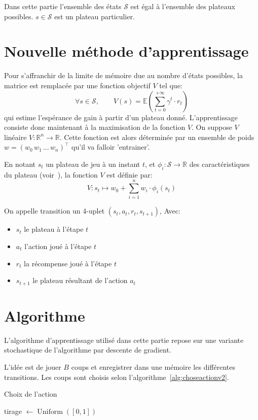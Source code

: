 \documentclass{report}
\newcommand{\R}{\mathbb{R}}
\DeclareMathOperator{\argmax}{argmax}
\DeclareMathOperator{\uniform}{Uniform}
\begin{document}
Dans cette partie l'ensemble des états \( \mathcal{S} \) est égal à l'ensemble
des plateaux possibles. \( s \in \mathcal{S} \) est un plateau particulier.

\section{Nouvelle méthode d'apprentissage}

Pour s'affranchir de la limite de mémoire due au nombre d'états possibles, la
matrice est remplacée par une fonction objectif \( V \) tel que:
\[
\forall s \in \mathcal{S}, \qquad V(s) =
\mathbb{E}(\sum_{t=0}^{+\infty} \gamma ^t \cdot r_t)
\]
qui estime l'espérance de gain à partir d'un plateau donné.
L'apprentissage consiste donc maintenant à la maximisation de la
fonction \( V \).
On suppose \( V \) linéaire \(V \colon \R^n \to \R\). Cette fonction est alors
déterminée par un ensemble de poids \(w = (w_0\, w_1\, \dots\, w_n)^\top\)
qu'il va falloir 'entrainer'.

En notant \( s_t \) un plateau de jeu à un instant \( t \), et
\(\phi_i\colon \mathcal{S} \to \R\) des caractéristiques du plateau
(voir~\cite{boumaza13}), la fonction \(V\)
est définie par:
\[
  V \colon s_t \mapsto w_0 + \sum_{i=1}^n w_i \cdot \phi_i (s_t)
\]

On appelle transition un 4-uplet \( (s_t, a_t, r_t, s_{t+1}) \), Avec:
\begin{itemize}
    \item \( s_t \) le plateau à l'étape \( t \)
    \item \( a_t \) l'action joué à l'étape \( t \)
    \item \( r_t \) la récompense joué à l'étape \( t \)
    \item \( s_{t+1} \) le plateau résultant de l'action \( a_t \)
\end{itemize}


\section{Algorithme}

L'algorithme d'apprentissage utilisé dans cette partie repose sur une variante
stochastique de l'algorithme par descente de gradient.

L'idée est de jouer \( B \) coups et enregistrer dans une mémoire les différentes
transitions. Les coups sont choisis selon l'algorithme~\ref{alg:choseactionv2}.

\begin{algorithm}[h]
  \caption{Choix de l'action}\label{alg:choseactionv2}
  \begin{algorithmic}
    [1]
    \State{} tirage \(\gets \uniform([0, 1])\)
    \State{}\Return{\(\argmax_{{a_t}\in\mathcal{A}} [r_t + \gamma V(s_{t+1})] \)}
    \\ 
    \Else{}
    \State{}\Return{\(\uniform(\mathcal{A})\)}
    \EndIf{}
    \EndProcedure{}
  \end{algorithmic}
\end{algorithm}
\end{document}
